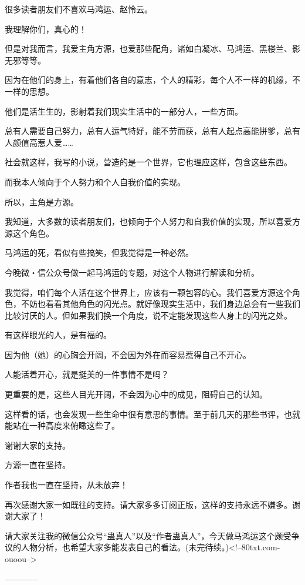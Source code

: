 \begin{this_body}
很多读者朋友们不喜欢马鸿运、赵怜云。

我理解你们，真心的！

但是对我而言，我爱主角方源，也爱那些配角，诸如白凝冰、马鸿运、黑楼兰、影无邪等等。

因为在他们的身上，有着他们各自的意志，个人的精彩，每个人不一样的机缘，不一样的思想。

他们是活生生的，影射着我们现实生活中的一部分人，一些方面。

总有人需要自己努力，总有人运气特好，能不劳而获，总有人起点高能拼爹，总有人颜值高惹人爱……

社会就这样，我写的小说，营造的是一个世界，它也理应这样，包含这些东西。

而我本人倾向于个人努力和个人自我价值的实现。

所以，主角是方源。

我知道，大多数的读者朋友们，也倾向于个人努力和自我价值的实现，所以喜爱方源这个角色。

马鸿运的死，看似有些搞笑，但我觉得是一种必然。

今晚微・信公众号做一起马鸿运的专题，对这个人物进行解读和分析。

我觉得，咱们每个人活在这个世界上，应该有一颗包容的心。我们喜爱方源这个角色，不妨也看看其他角色的闪光点。就好像现实生活中，我们身边总会有一些我们比较讨厌的人。但如果我们换一个角度，说不定能发现这些人身上的闪光之处。

有这样眼光的人，是有福的。

因为他（她）的心胸会开阔，不会因为外在而容易惹得自己不开心。

人能活着开心，就是挺美的一件事情不是吗？

更重要的是，这些人目光开阔，不会因为心中的成见，阻碍自己的认知。

这样看的话，也会发现一些生命中很有意思的事情。至于前几天的那些书评，也就能站在一种高度来俯瞰这些了。

谢谢大家的支持。

方源一直在坚持。

作者我也一直在坚持，从未放弃！

再次感谢大家一如既往的支持。请大家多多订阅正版，这样的支持永远不嫌多。谢谢大家了！

请大家关注我的微信公众号“蛊真人”以及“作者蛊真人”，今天做马鸿运这个颇受争议的人物分析，也希望大家多能发表自己的看法。(未完待续。)<!--80txt.com-ouoou-->

------------

\end{this_body}

